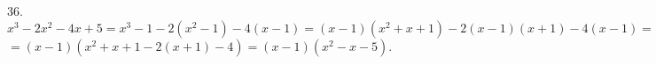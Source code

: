 36. $x^3-2x^2-4x+5=x^3-1-2(x^2-1)-4(x-1)=(x-1)(x^2+x+1)-2(x-1)(x+1)-4(x-1)=$\\$=(x-1)(x^2+x+1-2(x+1)-4)=(x-1)(x^2-x-5).$\\

